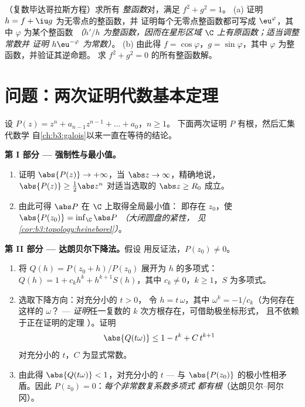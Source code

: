 \begin{exercise}[$\star\star$]\label{exo:b3:holomorphic:12}
（复数毕达哥拉斯方程）求所有
\emph{整函数}对，满足 $f^2 + g^2 = 1$。
(a) 证明 $h = f + \iu g$ 为无零点的整函数，并
证明每个无零点整函数都可写成 $\eu^{\varphi}$，其中
$\varphi$ 为某个整函数 \emph{（$h'/h$ 为整函数，因而在星形区域
$\C$ 上有原函数；适当调整常数并
证明 $h\eu^{-\varphi}$ 为常数）}。
(b) 由此得 $f = \cos\varphi$，$g = \sin\varphi$，其中
$\varphi$ 为整函数，并验证其逆命题。
求 $f^2 + g^2 = 0$ 的所有整函数解。
\end{exercise}

\section{问题：两次证明代数基本定理}

\begin{problem}\label{pb:b3:holomorphic:1}
设 $P(z) = z^n + a_{n-1}z^{n-1} + \dots + a_0$，$n \geq 1$。
下面两次证明 $P$ 有根，然后汇集代数学
自\cref{ch:b3:galois}以来一直在等待的结论。

\medskip
\noindent\textbf{第 I 部分 --- 强制性与最小值。}
\begin{enumerate}
  \item 证明 $\abs{P(z)} \to +\infty$，当 $\abs z \to
        \infty$，精确地说，$\abs{P(z)} \geq \frac12\abs z^n$
        对适当选取的 $\abs z \geq R_0$ 成立。
  \item 由此可得 $\abs P$ 在 $\C$ 上取得全局最小值：
        即存在 $z_0$，使 $\abs{P(z_0)} = \inf_\C\abs P$
        \emph{（大闭圆盘的紧性，
        见\cref{cor:b3:topology:heineborel}）}。
\end{enumerate}

\medskip
\noindent\textbf{第 II 部分 --- 达朗贝尔下降法。}假设
用反证法，$P(z_0) \neq 0$。
\begin{enumerate}[resume]
  \item 将 $Q(h) = P(z_0 + h)/P(z_0)$ 展开为
        $h$ 的多项式：$Q(h) = 1 + c_kh^k + h^{k+1}S(h)$，其中 $c_k \neq
        0$，$k \geq 1$，$S$ 为多项式。
  \item 选取下降方向：对充分小的 $t > 0$，
        令 $h = t\,\omega$，其中 $\omega^k = -1/c_k$（为何存在这样的 $\omega$？
        --- \emph{证明}任一复数的
        $k$ 次方根存在，可借助极坐标形式，
        且不依赖于正在证明的定理
        ）。证明
        \[
        \abs{Q(t\omega)} \leq 1 - t^k + C\,t^{k+1}
        \]
        对充分小的 $t$，$C$ 为显式常数。
  \item 由此得 $\abs{Q(t\omega)} < 1$，对充分小的 $t$ ---
        与 $\abs{P(z_0)}$ 的极小性相矛盾。因此
        $P(z_0) = 0$：\emph{每个非常数复系数多项式
        都有根}（达朗贝尔--阿尔冈）。
\end{enumerate}


\end{problem}
